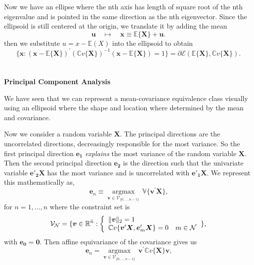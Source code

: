\documentclass[../main.tex]{subfiles}
\begin{document}
\par Now we have an ellipse where 
the nth axis has length of square root of the nth eigenvalue and is pointed 
in the same direction as the nth eigenvector. Since the ellipsoid
is still centered at the origin, we translate it by adding the mean
\begin{equation}
    \boldsymbol{u}\quad\mapsto\quad\boldsymbol{x}\equiv\mathbb{E}\{\boldsymbol{X}\}+\boldsymbol{u}\text{.}
    \end{equation}
then we substitute $u = x - \mathbb{E}(X)$ into the ellipsoid to obtain 
\begin{equation}
    \{\boldsymbol{x}:(\boldsymbol{x}-\mathbb{E}\{\boldsymbol{X}\})^{\prime}\left( \mathbb{C}v\{\boldsymbol{X}\}\right) ^{-1}(\boldsymbol{x}-\mathbb{E}\{\boldsymbol{X}\})=1\}=\partial\mathcal{E}(\mathbb{E}\{\boldsymbol{X}\},\mathbb{C}v\{\boldsymbol{X}\})\text{.}
    \end{equation}\\
\\ \textbf{Principal Component Analysis}\\
\par We have seen that we can represent
a mean-covariance equivalence class visually using an ellipsoid 
where the shape and location where determined by the mean and covariance.
\par Now we consider a random variable $\mathbf{X}$. The principal
directions are the uncorrelated directions, decreasingly responsible for the most variance.
So the first principal direction $\mathbf{e_1}$ \textit{explains} the most variance of the random variable $\mathbf{X}$. Then
the second principal direction $\mathbf{e_2}$ is the 
direction such that the univariate variable $\mathbf{e'_2X}$ has the most variance
and is uncorrelated with $\mathbf{e'_1X}$.
We represent this mathematically as, 
\begin{equation}
    \boldsymbol{e}_{n}\equiv\operatorname*{argmax}\limits_{\boldsymbol{v}\in\mathcal{V}_{\{0,...,n-1\}}}\,\mathbb{V}\{\boldsymbol{v}^{\prime}\boldsymbol{X}\}\text{,}
    \end{equation}
for $n = 1,\dots, n$ where the constraint set is 
\begin{equation}
    \mathcal{V}_{\mathcal{N}}=\{\boldsymbol{v}\in\mathbb{R}^{\bar{n}}:\left\{ \begin{array}
    [c]{ll}\Vert\boldsymbol{v}\Vert_{2}=1 & \\
    \mathbb{C}v\{\boldsymbol{v}^{\prime}\boldsymbol{X},\boldsymbol{e}_{m}^{\prime}\boldsymbol{X}\}=0 & m\in\mathcal{N}
    \end{array} \right. \}\text{,}
    \end{equation}
with $\mathbf{e_0} = \mathbf{0}$. Then
affine equivariance of the covariance gives us
\begin{equation}
    \boldsymbol{e}_{n}=\operatorname*{argmax}\limits_{\boldsymbol{v}\in \mathcal{V}_{\{0,...,n-1\}}}\,\boldsymbol{v}^{\prime}\mathbb{C}v\{\boldsymbol{X}\}\boldsymbol{v}\text{,}
    \end{equation}
\end{document}
